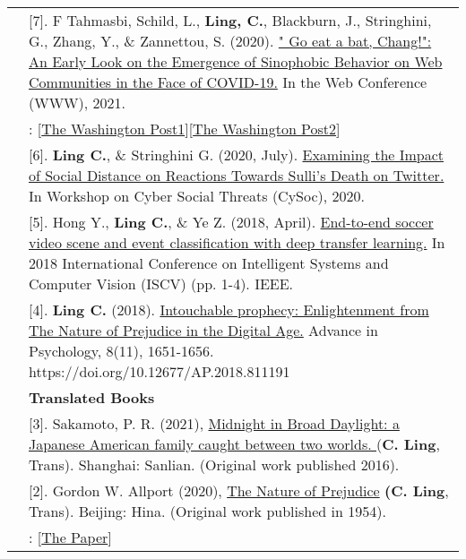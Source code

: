 \documentclass[letterpaper, 11pt]{article}
\begin{document}
\begin{longtable}{p{1.3in}p{4.8in}}
&[7]. F Tahmasbi, Schild, L., \textbf{Ling, C.}, Blackburn, J., Stringhini, G., Zhang, Y., \& Zannettou, S. (2020). \href{https://arxiv.org/pdf/2004.04046.pdf}{" Go eat a bat, Chang!": An Early Look on the Emergence of Sinophobic Behavior on Web Communities in the Face of COVID-19.} In the Web Conference (WWW), 2021.\\
&\color{OliveGreen}{Media Coverage}: [\href{https://www.washingtonpost.com/technology/2020/04/08/coronavirus-spreads-so-does-online-racism-targeting-asians-new-research-shows/}{The Washington Post1}][\href{https://www.washingtonpost.com/technology/2021/02/12/china-covid-misinformation-li-meng-yan/}{The Washington Post2}]\\

&[6]. \textbf{Ling C.}, \& Stringhini G. (2020, July). \href{https://seclab.bu.edu/people/gianluca/papers/sulli-cysoc2020.pdf}{Examining the Impact of Social Distance on Reactions Towards Sulli’s Death on Twitter.} In Workshop on Cyber Social Threats (CySoc), 2020.\\

&[5]. Hong Y., \textbf{Ling C.}, \& Ye Z. (2018, April). \href{https://ieeexplore.ieee.org/abstract/document/8369043}{End-to-end soccer video scene and event classification with deep transfer learning.} In 2018 International Conference on Intelligent Systems and Computer Vision (ISCV) (pp. 1-4). IEEE.\\

&[4]. \textbf{Ling C.} (2018). \href{https://pdf.hanspub.org//AP20181100000_50259940.pdf}{Intouchable prophecy: Enlightenment from The Nature of Prejudice in the Digital Age.} Advance in Psychology, 8(11), 1651-1656. https://doi.org/10.12677/AP.2018.811191\\

& \textbf{Translated Books}\\

& [3]. Sakamoto, P. R. (2021), \href{https://book.douban.com/subject/35476851/}{Midnight in Broad Daylight: a Japanese American family caught between two worlds. }(\textbf{C. Ling}, Trans). Shanghai: Sanlian. (Original work published 2016).\\

& [2]. Gordon W. Allport (2020), \href{https://book.douban.com/subject/35220441/?icn=index-topchart-subject}{The Nature of Prejudice} \textbf{(C. Ling}, Trans). Beijing: Hina. (Original work published in 1954).\\
&\color{OliveGreen}{Media Coverages}:
[\href{https://www.thepaper.cn/asktopic_detail_10019723}{The Paper}]\\


\end{longtable}
\end{document}
